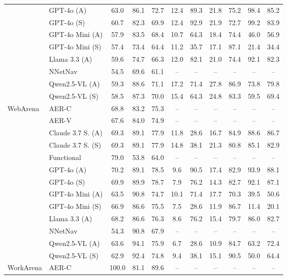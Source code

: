 \begin{tabular}{ll @{\hskip 15pt} ccc @{\hskip 20pt} ccc @{\hskip 20pt} ccc}
 & GPT-4o (A) & 63.0 & 86.1 & 72.7 & 12.4 & 89.3 & 21.8 & 75.2 & 98.4 & 85.2 \\
 & GPT-4o (S) & 60.7 & 82.3 & 69.9 & 12.4 & 92.9 & 21.9 & 72.7 & 99.2 & 83.9 \\
 & GPT-4o Mini (A) & 57.9 & 83.5 & 68.4 & 10.7 & 64.3 & 18.4 & 74.4 & 46.0 & 56.9 \\
 & GPT-4o Mini (S) & 57.4 & 73.4 & 64.4 & 11.2 & 35.7 & 17.1 & 87.1 & 21.4 & 34.4 \\
 & Llama 3.3 (A) & 59.6 & 74.7 & 66.3 & 12.0 & 82.1 & 21.0 & 74.4 & 92.1 & 82.3 \\
 & NNetNav & 54.5 & 69.6 & 61.1 & -- & -- & -- & -- & -- & -- \\
 & Qwen2.5-VL (A) & 59.3 & 88.6 & 71.1 & 17.2 & 71.4 & 27.8 & 86.9 & 73.8 & 79.8 \\
 & Qwen2.5-VL (S) & 58.5 & 87.3 & 70.0 & 15.4 & 64.3 & 24.8 & 83.3 & 59.5 & 69.4 \\
\midrule
\multirow[*]{13}{*}{WebArena} & AER-C & 68.8 & 83.2 & 75.3 & -- & -- & -- & -- & -- & -- \\
 & AER-V & 67.6 & 84.0 & 74.9 & -- & -- & -- & -- & -- & -- \\
 & Claude 3.7 S. (A) & 69.3 & 89.1 & 77.9 & 11.8 & 28.6 & 16.7 & 84.9 & 88.6 & 86.7 \\
 & Claude 3.7 S. (S) & 69.3 & 89.1 & 77.9 & 14.8 & 38.1 & 21.3 & 80.8 & 85.1 & 82.9 \\
 & Functional & 79.0 & 53.8 & 64.0 & -- & -- & -- & -- & -- & -- \\
 & GPT-4o (A) & 70.2 & 89.1 & 78.5 & 9.6 & 90.5 & 17.4 & 82.9 & 93.9 & 88.1 \\
 & GPT-4o (S) & 69.9 & 89.9 & 78.7 & 7.9 & 76.2 & 14.3 & 82.7 & 92.1 & 87.1 \\
 & GPT-4o Mini (A) & 63.5 & 90.8 & 74.7 & 10.1 & 71.4 & 17.7 & 70.3 & 39.5 & 50.6 \\
 & GPT-4o Mini (S) & 66.9 & 86.6 & 75.5 & 7.5 & 28.6 & 11.9 & 86.7 & 11.4 & 20.1 \\
 & Llama 3.3 (A) & 68.2 & 86.6 & 76.3 & 8.6 & 76.2 & 15.4 & 79.7 & 86.0 & 82.7 \\
 & NNetNav & 54.3 & 90.8 & 67.9 & -- & -- & -- & -- & -- & -- \\
 & Qwen2.5-VL (A) & 63.6 & 94.1 & 75.9 & 6.7 & 28.6 & 10.9 & 84.7 & 63.2 & 72.4 \\
 & Qwen2.5-VL (S) & 62.9 & 92.4 & 74.8 & 9.4 & 38.1 & 15.1 & 90.5 & 50.0 & 64.4 \\
\midrule
\multirow[*]{13}{*}{WorkArena} & AER-C & 100.0 & 81.1 & 89.6 & -- & -- & -- & -- & -- & -- \\

\end{tabular}
